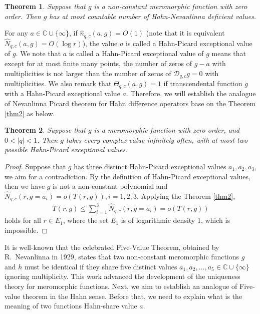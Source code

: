 \documentclass[sn-mathphys-num]{sn-jnl}%
\theoremstyle{thmstyleone}%
\newtheorem{theorem}{Theorem}%
\theoremstyle{thmstyletwo}%
\theoremstyle{thmstylethree}%
\begin{document}
\begin{theorem}Suppose that $g$ is a non-constant meromorphic function with zero order. Then $g$ has at most countable number of Hahn-Nevanlinna deficient values.
\end{theorem}
\indent For any $a\in\mathbb{C}\cup\{\infty\}$, if $\hat{n}_{q,c}(a,g)=O(1)$ (note that it is equivalent $\hat{N}_{q,c}(a,g)=O(\log r)$), the value $a$ is called a Hahn-Picard exceptional value of $g$. We note that $a$ is called a Hahn-Picard exceptional value of $g$ means that except for at most finite many points, the number of zeros of $g-a$ with multiplicities is not larger than the number of zeros of $\mathcal{D}_{q,c}g=0$ with multiplicities. We also remark that $\Theta_{q,c}(a,g)=1$ if transcendental function $g$ with a Hahn-Picard exceptional value $a$. Therefore, we will establish the analogue of Nevanlinna Picard theorem for Hahn difference operators base on the Theorem \ref{thm2} as below.\\		
\begin{theorem}
	Suppose that $g$ is a meromorphic function with zero order, and $0<|q|<1$. Then $g$ takes every complex value infinitely often, with at most two possible Hahn-Picard exceptional values.
\end{theorem}		
\begin{proof}
	Suppose that $g$ has three distinct Hahn-Picard exceptional values $a_{1},a_{2},a_{3}$, we aim for a contradiction. By the definition of Hahn-Picard exceptional values, then we have
	$g$ is not a non-constant polynomial and $\hat{N}_{q,c}(r,g=a_{i})=o(T(r,g)),i=1,2,3$. Applying the Theorem \ref{thm2},
	\begin{align*}
		T(r,g)\leq\sum_{i=1}^{3}\hat{N}_{q,c}(r,g=a_{i})=o(T(r,g))
	\end{align*}
	holds for all $r\in E_{1}$, where the set $E_{1}$ is of logarithmic density 1, which is impossible.
\end{proof}
\indent It is well-known that the celebrated Five-Value Theorem, obtained by R.~Nevanlinna in 1929, states that two non-constant meromorphic functions $g$ and $h$ must be identical if they share five distinct values $a_{1}, a_{2}, \dots, a_{5} \in \mathbb{C}\cup\{\infty\}$ ignoring multiplicity. This work advanced the development of the uniqueness theory for meromorphic functions. Next, we aim to establish an analogue of Five-value theorem in the Hahn sense. Before that, we need to explain what is the meaning of two functions Hahn-share value $a$.\\		
\end{document}
